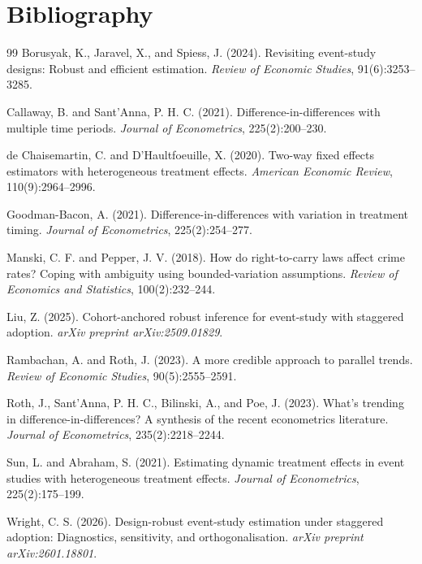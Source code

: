 \documentclass[11pt]{article}
\theoremstyle{definition}
\theoremstyle{plain}
\theoremstyle{remark}
\begin{document}
\section*{Bibliography}
\begin{thebibliography}{99}
Borusyak, K., Jaravel, X., and Spiess, J. (2024).
\newblock Revisiting event-study designs: Robust and efficient estimation.
\newblock \emph{Review of Economic Studies}, 91(6):3253--3285.

Callaway, B. and Sant'Anna, P. H. C. (2021).
\newblock Difference-in-differences with multiple time periods.
\newblock \emph{Journal of Econometrics}, 225(2):200--230.

de Chaisemartin, C. and D'Haultfoeuille, X. (2020).
\newblock Two-way fixed effects estimators with heterogeneous treatment effects.
\newblock \emph{American Economic Review}, 110(9):2964--2996.

Goodman-Bacon, A. (2021).
\newblock Difference-in-differences with variation in treatment timing.
\newblock \emph{Journal of Econometrics}, 225(2):254--277.

Manski, C. F. and Pepper, J. V. (2018).
\newblock How do right-to-carry laws affect crime rates? {C}oping with ambiguity using bounded-variation assumptions.
\newblock \emph{Review of Economics and Statistics}, 100(2):232--244.

Liu, Z. (2025).
\newblock Cohort-anchored robust inference for event-study with staggered adoption.
\newblock \emph{arXiv preprint arXiv:2509.01829}.

Rambachan, A. and Roth, J. (2023).
\newblock A more credible approach to parallel trends.
\newblock \emph{Review of Economic Studies}, 90(5):2555--2591.

Roth, J., Sant'Anna, P. H. C., Bilinski, A., and Poe, J. (2023).
\newblock What's trending in difference-in-differences? {A} synthesis of the recent econometrics literature.
\newblock \emph{Journal of Econometrics}, 235(2):2218--2244.

Sun, L. and Abraham, S. (2021).
\newblock Estimating dynamic treatment effects in event studies with heterogeneous treatment effects.
\newblock \emph{Journal of Econometrics}, 225(2):175--199.

Wright, C. S. (2026).
\newblock Design-robust event-study estimation under staggered adoption: Diagnostics, sensitivity, and orthogonalisation.
\newblock \emph{arXiv preprint arXiv:2601.18801}.
\end{thebibliography}
\end{document}
